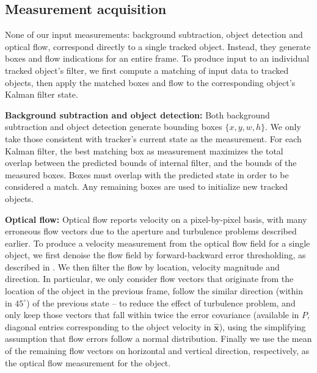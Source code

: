 \subsection{Measurement acquisition}

None of our input measurements: background subtraction, object detection and optical flow, correspond directly to a single tracked object. Instead, they generate boxes and flow indications for an entire frame.
To produce input to an individual tracked object's filter, we first compute a matching of input data to tracked objects, then apply the matched boxes and flow to the corresponding object's Kalman filter state. 

\textbf{Background subtraction and object detection:}
Both background subtraction and object detection generate bounding boxes $\{x,y,w,h\}$. We only take those consistent with tracker's current state as the measurement. For each Kalman filter, the best matching box as measurement maximizes the total overlap between the predicted bounds of internal filter, and the bounds of the measured boxes. Boxes must overlap with the predicted state in order to be considered a match. Any remaining boxes are used to initialize new tracked objects. 

\textbf{Optical flow:}  
Optical flow reports velocity on a pixel-by-pixel basis, with many erroneous flow vectors due to the aperture and turbulence problems described earlier. To produce a velocity measurement from the optical flow field for a single object, we first denoise the flow field by forward-backward error thresholding, as described in \cite{kalal2010forward}. We then filter the flow by location, velocity magnitude and direction. In particular, we only consider flow vectors that originate from the location of the object in the previous frame, follow the similar direction (within in $45^\circ$) of the previous state -- to reduce the effect of turbulence problem, and only keep those vectors that fall within twice the error covariance 
(available in $P$, diagonal entries corresponding to the object velocity in $\mathbf{\hat x}$), using the simplifying assumption that flow errors follow a normal distribution. 
%
Finally we use the mean of the remaining flow vectors on horizontal and vertical direction, respectively, as the optical flow measurement for the object. 

